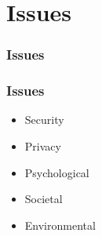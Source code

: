 \documentclass{beamer}
\begin{document}
     \section{Issues}
     \begin{frame}
     	\frametitle{Issues}
      
     \end{frame}
      \begin{frame}
      	\frametitle{Issues}
      	\begin{itemize}
      		\item Security
      		\item Privacy
      		\item Psychological
      		\item Societal
      		\item Environmental
      	\end{itemize}
      \end{frame}       
\end{document}
